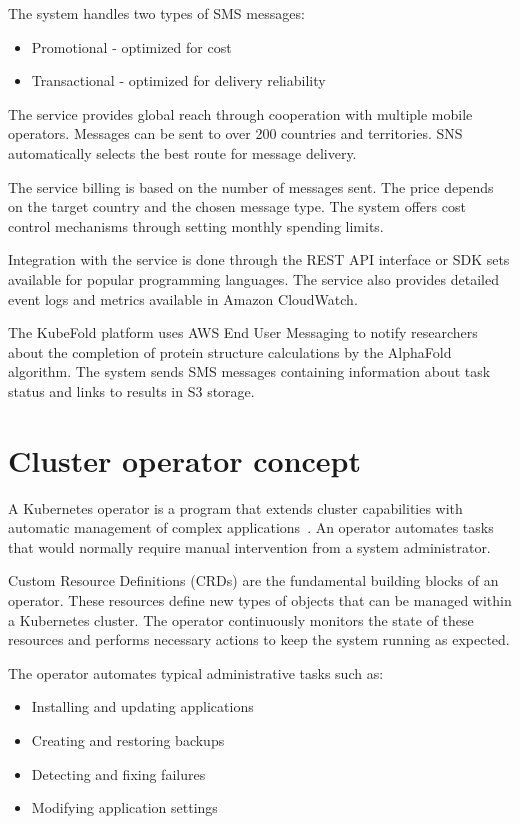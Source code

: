 The system handles two types of SMS messages:
\begin{itemize}
    \item Promotional - optimized for cost
    \item Transactional - optimized for delivery reliability
\end{itemize}

The service provides global reach through cooperation with multiple mobile operators.
Messages can be sent to over 200 countries and territories.
SNS automatically selects the best route for message delivery.

The service billing is based on the number of messages sent.
The price depends on the target country and the chosen message type.
The system offers cost control mechanisms through setting monthly spending limits.

Integration with the service is done through the REST API interface or SDK sets available for popular programming languages.
The service also provides detailed event logs and metrics available in Amazon CloudWatch.

The KubeFold platform uses AWS End User Messaging to notify researchers about the completion of protein structure calculations by the AlphaFold algorithm.
The system sends SMS messages containing information about task status and links to results in S3 storage.


\section{Cluster operator concept}

A Kubernetes operator is a program that extends cluster capabilities with automatic management of complex applications~\cite{k8s_operators}.
An operator automates tasks that would normally require manual intervention from a system administrator.

Custom Resource Definitions (CRDs) are the fundamental building blocks of an operator.
These resources define new types of objects that can be managed within a Kubernetes cluster.
The operator continuously monitors the state of these resources and performs necessary actions to keep the system running as expected.

The operator automates typical administrative tasks such as:
\begin{itemize}
    \item Installing and updating applications
    \item Creating and restoring backups
    \item Detecting and fixing failures
    \item Modifying application settings
\end{itemize}

